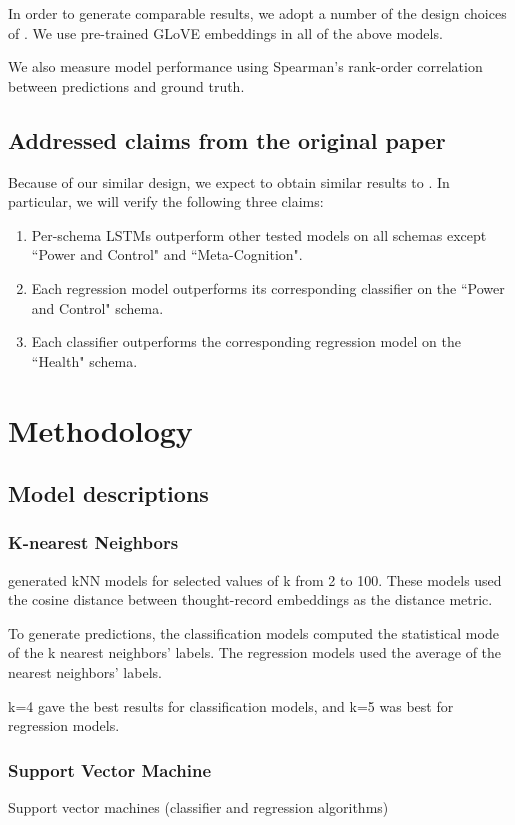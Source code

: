 \documentclass[11pt,a4paper]{article}
\begin{document}
In order to generate comparable results, we adopt a number of the design choices of \citeauthor{burger_2021}. We use pre-trained GLoVE embeddings \citep{pennington_2014} in all of the above models. 

We also measure model performance using Spearman's rank-order correlation between predictions and ground truth. 

\subsection{Addressed claims from the original paper}
Because of our similar design, we expect to obtain similar results to \citeauthor{burger_2021}. In particular, we will verify the following three claims:
\begin{enumerate}
    \item Per-schema LSTMs outperform other tested models on all schemas except ``Power and Control" and ``Meta-Cognition".
    \item Each regression model outperforms its corresponding classifier on the ``Power and Control" schema.
    \item Each classifier outperforms the corresponding regression model on the ``Health" schema.
\end{enumerate}

\section{Methodology}
\subsection{Model descriptions}
\subsubsection{K-nearest Neighbors}
\citeauthor{burger_2021} generated kNN models for selected values of k from 2 to 100. These models used the cosine distance between thought-record embeddings as the distance metric.

To generate predictions, the classification models computed the statistical mode of the k nearest neighbors' labels. The regression models used the average of the nearest neighbors' labels.

k=4 gave the best results for classification models, and k=5 was best for regression models.

\subsubsection{Support Vector Machine}
Support vector machines (classifier and regression algorithms)
\end{document}
